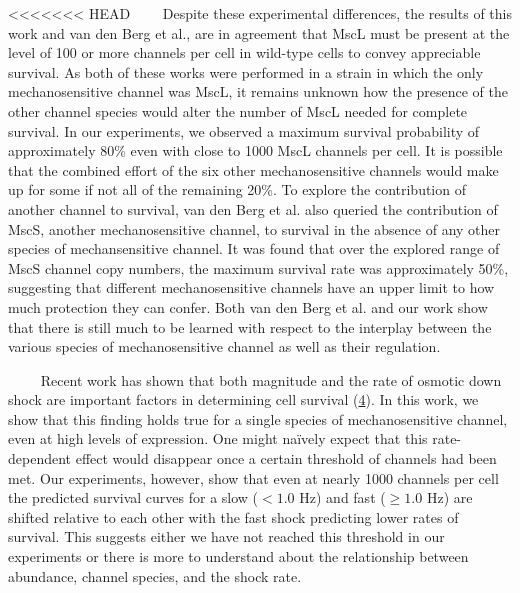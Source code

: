 <<<<<<< HEAD
~~~~Despite
these
experimental
differences,
the
results
of
this
work
and
van
den
Berg
et
al.,
are in
agreement
that
MscL
must
be
present
at the
level
of 100
or
more
channels
per
cell
in
wild-type
cells
to
convey
appreciable
survival.
As
both
of
these
works
were
performed
in a
strain
in
which
the
only
mechanosensitive
channel
was
MscL,
it
remains
unknown
how
the
presence
of the
other
channel
species
would
alter
the
number
of
MscL
needed
for
complete
survival.
In our
experiments,
we
observed
a
maximum
survival
probability
of
approximately
80\%
even
with
close
to
1000
MscL
channels
per
cell.
It is
possible
that
the
combined
effort
of the
six
other
mechanosensitive
channels
would
make
up for
some
if not
all of
the
remaining
20\%.
To
explore
the
contribution
of
another
channel
to
survival,
van
den
Berg
et al.
also
queried
the
contribution
of
MscS,
another
mechanosensitive
channel,
to
survival
in the
absence
of any
other
species
of
mechansensitive
channel.
It was
found
that
over
the
explored
range
of
MscS
channel
copy
numbers,
the
maximum
survival
rate
was
approximately
50\%,
suggesting
that
different
mechanosensitive
channels
have
an
upper
limit
to how
much
protection
they
can
confer.
Both
van
den
Berg
et al.
and
our
work
show
that
there
is
still
much
to be
learned
with
respect
to the
interplay
between
the
various
species
of
mechanosensitive
channel
as
well
as
their
regulation.

~~~~
Recent
work
has
shown
that
both
magnitude
and
the
rate
of
osmotic
down
shock
are
important
factors
in
determining
cell
survival
(\protect\hyperlink{ref-bialecka-fornal2015}{4}).
In
this
work,
we
show
that
this
finding
holds
true
for a
single
species
of
mechanosensitive
channel,
even
at
high
levels
of
expression.
One
might
naïvely
expect
that
this
rate-dependent
effect
would
disappear
once a
certain
threshold
of
channels
had
been
met.
Our
experiments,
however,
show
that
even
at
nearly
1000
channels
per
cell
the
predicted
survival
curves
for a
slow
(\(< 1.0\)
Hz)
and
fast
(\(\geq 1.0\)
Hz)
are
shifted
relative
to
each
other
with
the
fast
shock
predicting
lower
rates
of
survival.
This
suggests
either
we
have
not
reached
this
threshold
in our
experiments
or
there
is
more
to
understand
about
the
relationship
between
abundance,
channel
species,
and
the
shock
rate.

